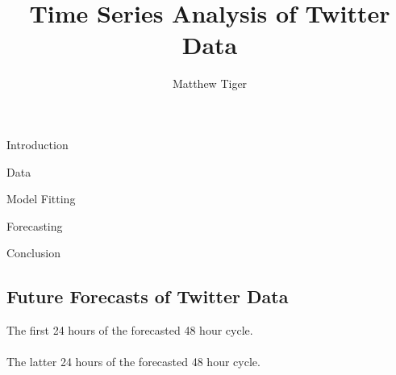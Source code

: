 \documentclass[12pt]{amsart}
\title{
  {Time Series Analysis of Twitter Data}\\
}
\author{
  Matthew Tiger \\
}
\begin{document}
\maketitle
\newpage


\begin{section}{Introduction}
  
\end{section}


\begin{section}{Data}\label{data}
  
\end{section}


\begin{section}{Model Fitting}\label{model}
  
\end{section}


\begin{section}{Forecasting}
  
\end{section}


\begin{section}{Conclusion}
  
\end{section}


\newpage
\begin{appendices}
\section{Future Forecasts of Twitter Data}\label{forecast_table}
The first 24 hours of the forecasted 48 hour cycle.\\\\
\newpage
The latter 24 hours of the forecasted 48 hour cycle.\\\\
\end{appendices}
\end{document}

